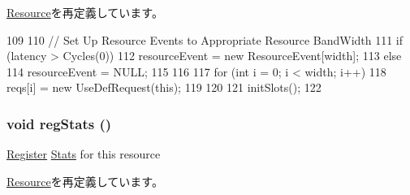 \hyperlink{classResource_a02fd73d861ef2e4aabb38c0c9ff82947}{Resource}を再定義しています。


\begin{DoxyCode}
109 {
110     // Set Up Resource Events to Appropriate Resource BandWidth
111     if (latency > Cycles(0)) {
112         resourceEvent = new ResourceEvent[width];
113     } else {
114         resourceEvent = NULL;
115     }
116 
117     for (int i = 0; i < width; i++) {
118         reqs[i] = new UseDefRequest(this);
119     }
120 
121     initSlots();
122 }
\end{DoxyCode}
\hypertarget{classUseDefUnit_a4dc637449366fcdfc4e764cdf12d9b11}{
\subsubsection[{regStats}]{\setlength{\rightskip}{0pt plus 5cm}void regStats ()}}
\label{classUseDefUnit_a4dc637449366fcdfc4e764cdf12d9b11}
\hyperlink{classRegister}{Register} \hyperlink{namespaceStats}{Stats} for this resource 

\hyperlink{classResource_ac1739a9be0fbd5d96cf441cd3b2c1c78}{Resource}を再定義しています。


